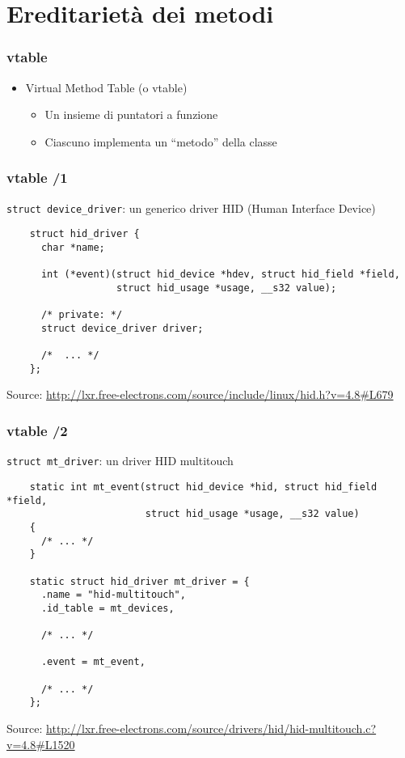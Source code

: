 \documentclass[xetex,table]{beamer}
\begin{document}
\section{Ereditarietà dei metodi}

\begin{frame}[fragile]
  \frametitle{vtable}
  \begin{itemize}
  \item Virtual Method Table (o vtable)
    \begin{itemize}
    \item Un insieme di puntatori a funzione
    \item Ciascuno implementa un ``metodo'' della classe
    \end{itemize}
  \end{itemize}
\end{frame}

\begin{frame}[fragile]
  \frametitle{vtable /1}
  \texttt{struct device\_driver}: un generico driver HID (Human Interface Device)

  \begin{verbatim}
    struct hid_driver {
      char *name;

      int (*event)(struct hid_device *hdev, struct hid_field *field,
                   struct hid_usage *usage, __s32 value);

      /* private: */
      struct device_driver driver;

      /*  ... */
    };
  \end{verbatim}
  {\tiny Source:
    \url{http://lxr.free-electrons.com/source/include/linux/hid.h?v=4.8#L679}}
\end{frame}

\begin{frame}[fragile]
  \frametitle{vtable /2}
  \texttt{struct mt\_driver}: un driver HID multitouch

  \begin{verbatim}
    static int mt_event(struct hid_device *hid, struct hid_field *field,
                        struct hid_usage *usage, __s32 value)
    {
      /* ... */
    }

    static struct hid_driver mt_driver = {
      .name = "hid-multitouch",
      .id_table = mt_devices,

      /* ... */

      .event = mt_event,

      /* ... */
    };
  \end{verbatim}
  {\tiny Source:
    \url{http://lxr.free-electrons.com/source/drivers/hid/hid-multitouch.c?v=4.8#L1520}}
\end{frame}
\end{document}
